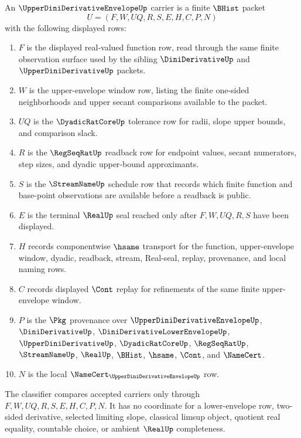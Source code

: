 \begin{definition}
\label{def:upper-dini-derivative-envelope-carrier}
An $\UpperDiniDerivativeEnvelopeUp$ carrier is a finite $\BHist$ packet
$$
U=(F,W,UQ,R,S,E,H,C,P,N)
$$
with the following displayed rows:
\begin{enumerate}
\item $F$ is the displayed real-valued function row, read through the same finite observation surface used by the sibling $\DiniDerivativeUp$ and $\UpperDiniDerivativeUp$ packets.
\item $W$ is the upper-envelope window row, listing the finite one-sided neighborhoods and upper secant comparisons available to the packet.
\item $UQ$ is the $\DyadicRatCoreUp$ tolerance row for radii, slope upper bounds, and comparison slack.
\item $R$ is the $\RegSeqRatUp$ readback row for endpoint values, secant numerators, step sizes, and dyadic upper-bound approximants.
\item $S$ is the $\StreamNameUp$ schedule row that records which finite function and base-point observations are available before a readback is public.
\item $E$ is the terminal $\RealUp$ seal reached only after $F,W,UQ,R,S$ have been displayed.
\item $H$ records componentwise $\hsame$ transport for the function, upper-envelope window, dyadic, readback, stream, Real-seal, replay, provenance, and local naming rows.
\item $C$ records displayed $\Cont$ replay for refinements of the same finite upper-envelope window.
\item $P$ is the $\Pkg$ provenance over $\UpperDiniDerivativeEnvelopeUp$, $\DiniDerivativeUp$, $\DiniDerivativeLowerEnvelopeUp$, $\UpperDiniDerivativeUp$, $\DyadicRatCoreUp$, $\RegSeqRatUp$, $\StreamNameUp$, $\RealUp$, $\BHist$, $\hsame$, $\Cont$, and $\NameCert$.
\item $N$ is the local $\NameCert_{\UpperDiniDerivativeEnvelopeUp}$ row.
\end{enumerate}
The classifier compares accepted carriers only through $F,W,UQ,R,S,E,H,C,P,N$. It has no coordinate for a lower-envelope row, two-sided derivative, selected limiting slope, classical limsup object, quotient real equality, countable choice, or ambient $\RealUp$ completeness.
\end{definition}

